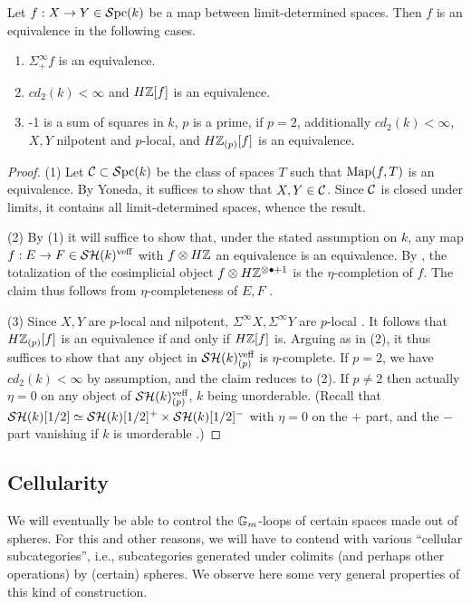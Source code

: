 \documentclass{amsart}
\numberwithin{proposition}{section}
\numberwithin{equation}{section}
\begin{document}
\begin{lemma}\label{lemm:limit-determined-M-test}
Let $f: X \to Y \in \mathcal{S}\mathrm{pc}{}(k)$ be a map between limit-determined spaces.
Then $f$ is an equivalence in the following cases.
\begin{enumerate}
\item $\Sigma^\infty_+ f$ is an equivalence.
\item $cd_2(k) < \infty$ and $H\mathbb{Z}[f]$ is an equivalence.
\item -1 is a sum of squares in $k$, $p$ is a prime, if $p=2$, additionally $cd_2(k) < \infty$, %
$X, Y$ nilpotent and $p$-local, and $H\mathbb{Z}_{(p)}[f]$ is an equivalence.
\end{enumerate}
\end{lemma}
\begin{proof}
(1) Let $\mathcal C \subset \mathcal{S}\mathrm{pc}{}(k)$ be the class of spaces $T$ such that $\mathrm{Map}(f,T)$ is an equivalence.
By Yoneda, it suffices to show that $X, Y \in \mathcal C$.
Since $\mathcal C$ is closed under limits, it contains all limit-determined spaces, whence the result.

(2) By (1) it will suffice to show that, under the stated assumption on $k$, any map $f: E \to F \in \mathcal{SH}(k)^{\text{veff}}$ with $f \otimes H\mathbb{Z}$ an equivalence is an equivalence.
By \cite[Theorem~7.3.4 and \S5.2]{mantovani2018localizations}, the totalization of the cosimplicial object $f \otimes H\mathbb{Z}^{\otimes \bullet +1}$ is the $\eta$-completion of $f$.
The claim thus follows from $\eta$-completeness of $E,F$ \cite[Lemma 6.43]{bachmann-resolution}.

(3) Since $X, Y$ are $p$-local and nilpotent, $\Sigma^\infty X, \Sigma^\infty Y$ are $p$-local \cite[Proposition~2.2.16]{freudenthal}.
It follows that $H\mathbb{Z}_{(p)}[f]$ is an equivalence if and only if $H\mathbb{Z}[f]$ is.
Arguing as in (2), it thus suffices to show that any object in $\mathcal{SH}(k)^{\text{veff}}_{(p)}$ is $\eta$-complete.
If $p=2$, we have $cd_2(k) < \infty$ by assumption, and the claim reduces to (2).
If $p \ne 2$ then actually $\eta = 0$ on any object of $\mathcal{SH}(k)^{\text{veff}}_{(p)}$, $k$ being unorderable.
(Recall that $\mathcal{SH}(k)[1/2] \simeq \mathcal{SH}(k)[1/2]^+ \times \mathcal{SH}(k)[1/2]^-$ with $\eta=0$ on the $+$ part, and the $-$ part vanishing if $k$ is unorderable \cite[\S2.7.3 and Corollary~2.19]{bachmann-eta}.)
\end{proof}

\subsection{Cellularity} \label{subsec:cellularity}
We will eventually be able to control the ${\mathbb{G}_m}$-loops of certain spaces made out of spheres.
For this and other reasons, we will have to contend with various ``cellular subcategories'', i.e., subcategories generated under colimits (and perhaps other operations) by (certain) spheres.
We observe here some very general properties of this kind of construction.
\end{document}
